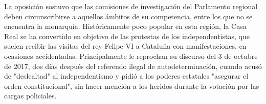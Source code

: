 \documentclass{article}%
\begin{document}
\newline%
%
La oposición sostuvo que las comisiones de investigación del Parlamento regional deben circunscribirse a aquellos ámbitos de su competencia, entre los que no se encuentra la monarquía.%
\newline%
%
Históricamente poco popular en esta región, la Casa Real se ha convertido en objetivo de las protestas de los independentistas, que suelen recibir las visitas del rey Felipe VI a Cataluña con manifestaciones, en ocasiones accidentadas.%
\newline%
%
Principalmente le reprochan su discurso del 3 de octubre de 2017, dos días después del referendo ilegal de autodeterminación, cuando acusó de "deslealtad" al independentismo y pidió a los poderes estatales "asegurar el orden constitucional", sin hacer mención a los heridos durante la votación por las cargas policiales.%
\newline%
%
\end{document}
